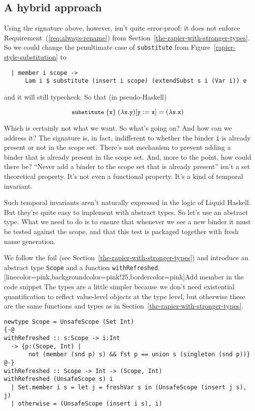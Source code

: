 \documentclass[sigconf, anonymous, review]{acmart}
\newcommand{\improvement}[1]{\todo[linecolor=pink,backgroundcolor=pink!25,bordercolor=pink]{#1}}
\renewcommand{\todo}{}
\newcommand{\improvement}[1]{{}}
\newcommand{\tc}[1]{{\small\texttt{#1}}}
\newcommand{\codeblocksize}{\fontsize{6.5}{9}\selectfont}
\begin{document}
\subsection{A hybrid approach}
\label{ensuring-the-scope-set-is-checked}

Using the signature above, however, isn't quite error-proof: it does not enforce
Requirement~(\ref{req:always-rename}) from
Section~\ref{the-rapier-with-stronger-types}.
So we could change the penultimate case of \tc{substitute} from
Figure~\ref{rapier-style-substitution} to
\begin{verbatim}
  | member i scope ->
      Lam i $ substitute (insert i scope) (extendSubst s i (Var i)) e
\end{verbatim}
and it will still typecheck. So that
(in pseudo-Haskell)

$$\codeblocksize{\tc{substitute}~\{\tc{x}\}~(\lambda{}\tc{x}. \tc{y}) [\tc{y}:=\tc{x}] = (\lambda{}\tc{x}. \tc{x})}$$

Which is certainly not what we want. So what's going on? And how can we address
it? The signature is, in fact, indifferent to whether the binder \tc{i}
is already present or not in the scope set. There's not mechanism to prevent
adding a binder that is already present in the scope set. And, more to the
point, how could there be? “Never add a binder to the scope set that is already
present” isn't a set theoretical property. It's not even a functional property.
It's a kind of temporal invariant.

Such temporal invariants aren't naturally expressed in the logic of Liquid Haskell.
But they're quite easy to implement with abstract types. So let's use an abstract
type. What we need to do is to ensure that whenever we see a new binder it must
be tested against the scope, and that this test is packaged together with fresh
name generation.

We follow the foil (see Section~\ref{the-rapier-with-stronger-types}) and
introduce an abstract type \tc{Scope} and a function \tc{withRefreshed}. \improvement{Add member in the code snippet} The types are a little
simpler because we don't need existential quantification to reflect value-level
objects at the type level, but otherwise these are the same functions and types
as in Section~\ref{the-rapier-with-stronger-types}.

\begin{verbatim}
newtype Scope = UnsafeScope (Set Int)
{-@
withRefreshed :: s:Scope -> i:Int
  -> {p:(Scope, Int) |
       not (member (snd p) s) && fst p == union s (singleton (snd p))}
@-}
withRefreshed :: Scope -> Int -> (Scope, Int)
withRefreshed (UnsafeScope s) i
  | Set.member i s = let j = freshVar s in (UnsafeScope (insert j s), j)
  | otherwise = (UnsafeScope (insert i s), i)
\end{verbatim}
\end{document}
